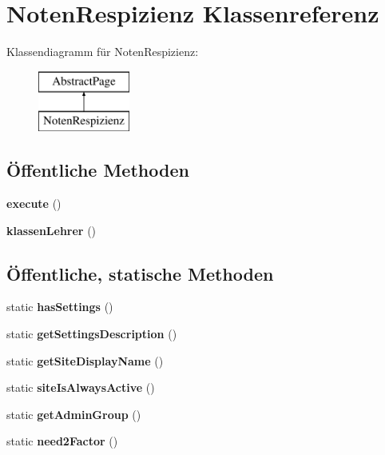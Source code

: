 \hypertarget{class_noten_respizienz}{}\section{Noten\+Respizienz Klassenreferenz}
\label{class_noten_respizienz}
Klassendiagramm für Noten\+Respizienz\+:\begin{figure}[H]
\begin{center}
\leavevmode
\includegraphics[height=2.000000cm]{class_noten_respizienz}
\end{center}
\end{figure}
\subsection*{Öffentliche Methoden}
\begin{DoxyCompactItemize}
\item 
\mbox{\label{class_noten_respizienz_a6ce3d2944c46aaf1e73778ea49e4ab40}} 
{\bfseries execute} ()
\item 
\mbox{\label{class_noten_respizienz_a520c658d118858498c6a0111d264d4ef}} 
{\bfseries klassen\+Lehrer} ()
\end{DoxyCompactItemize}
\subsection*{Öffentliche, statische Methoden}
\begin{DoxyCompactItemize}
\item 
\mbox{\label{class_noten_respizienz_a593a1e37b1816688298b069789a8012b}} 
static {\bfseries has\+Settings} ()
\item 
\mbox{\label{class_noten_respizienz_a3e51f39c07aed7c410d60a19e48ee214}} 
static {\bfseries get\+Settings\+Description} ()
\item 
\mbox{\label{class_noten_respizienz_abeac1c14c21c3c2cbef58568bd57165f}} 
static {\bfseries get\+Site\+Display\+Name} ()
\item 
\mbox{\label{class_noten_respizienz_a4873161d5c27951a00449a1a4b820b06}} 
static {\bfseries site\+Is\+Always\+Active} ()
\item 
\mbox{\label{class_noten_respizienz_aa2cdb1ef912de746a9f9224c74f32ab2}} 
static {\bfseries get\+Admin\+Group} ()
\item 
\mbox{\label{class_noten_respizienz_a81b0630e62b018a5860a86d9c1e26210}} 
static {\bfseries need2\+Factor} ()
\end{DoxyCompactItemize}
